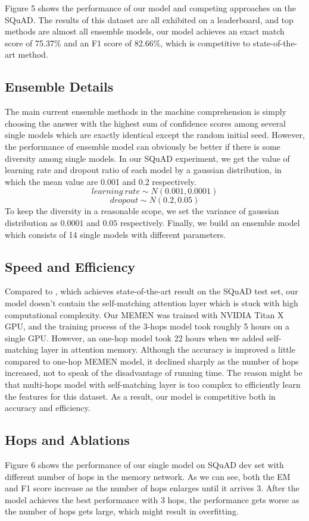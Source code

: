 \documentclass[letterpaper]{article}
\begin{document}
Figure 5 shows the performance of our model and competing approaches on the SQuAD. The results of this dataset are all exhibited on a leaderboard, and top methods are almost all ensemble models, our model achieves an exact match score of 75.37\% and an F1 score of 82.66\%, which is competitive to state-of-the-art method. 

\subsection{Ensemble Details}
The main current ensemble methods in the machine comprehension is simply choosing the answer with the highest sum of confidence scores among several single models which are exactly identical except the random initial seed. However, the performance of ensemble model can obviously be better if there is some diversity among single models. In our SQuAD experiment, we get the value of learning rate and dropout ratio of each model by a gaussian distribution, in which the mean value are 0.001 and 0.2 respectively. 
$$learning~rate \sim N(0.001, 0.0001) $$
$$dropout \sim N(0.2, 0.05)$$
To keep the diversity in a reasonable scope, we set the variance of gaussian distribution as $0.0001$ and $0.05$ respectively. Finally, we build an ensemble model which consists of 14 single models with different parameters.

\subsection{Speed and Efficiency}
Compared to \citep{rnet}, which achieves state-of-the-art result on the SQuAD test set, our model doesn't contain the self-matching attention layer which is stuck with high computational complexity. Our MEMEN was trained with NVIDIA Titan X GPU, and the training process of the 3-hops model took roughly 5 hours on a single GPU. However, an one-hop model took 22 hours when we added self-matching layer in attention memory. Although the accuracy is improved a little compared to one-hop MEMEN model, it declined sharply as the number of hops increased, not to speak of the disadvantage of running time. The reason might be that multi-hops model with self-matching layer is too complex to efficiently learn the features for this dataset. As a result, our model is competitive both in accuracy and efficiency.

\subsection{Hops and Ablations}
Figure 6 shows the performance of our single model on SQuAD dev set with different number of hops in the memory network. As we can see, both the EM and F1 score increase as the number of hops enlarges until it arrives 3. After the model achieves the best performance with 3 hops, the performance gets worse as the number of hops gets large, which might result in overfitting. 
\end{document}
